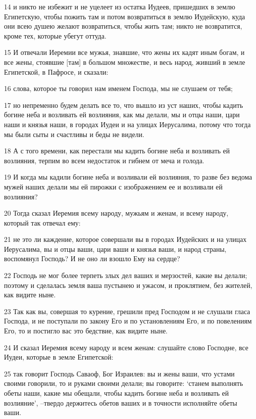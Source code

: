 \par 14 и никто не избежит и не уцелеет из остатка Иудеев, пришедших в землю Египетскую, чтобы пожить там и потом возвратиться в землю Иудейскую, куда они всею душею желают возвратиться, чтобы жить там; никто не возвратится, кроме тех, которые убегут оттуда.
\par 15 И отвечали Иеремии все мужья, знавшие, что жены их кадят иным богам, и все жены, стоявшие [там] в большом множестве, и весь народ, живший в земле Египетской, в Пафросе, и сказали:
\par 16 слова, которое ты говорил нам именем Господа, мы не слушаем от тебя;
\par 17 но непременно будем делать все то, что вышло из уст наших, чтобы кадить богине неба и возливать ей возлияния, как мы делали, мы и отцы наши, цари наши и князья наши, в городах Иудеи и на улицах Иерусалима, потому что тогда мы были сыты и счастливы и беды не видели.
\par 18 А с того времени, как перестали мы кадить богине неба и возливать ей возлияния, терпим во всем недостаток и гибнем от меча и голода.
\par 19 И когда мы кадили богине неба и возливали ей возлияния, то разве без ведома мужей наших делали мы ей пирожки с изображением ее и возливали ей возлияния?
\par 20 Тогда сказал Иеремия всему народу, мужьям и женам, и всему народу, который так отвечал ему:
\par 21 не это ли каждение, которое совершали вы в городах Иудейских и на улицах Иерусалима, вы и отцы ваши, цари ваши и князья ваши, и народ страны, воспомянул Господь? И не оно ли взошло Ему на сердце?
\par 22 Господь не мог более терпеть злых дел ваших и мерзостей, какие вы делали; поэтому и сделалась земля ваша пустынею и ужасом, и проклятием, без жителей, как видите ныне.
\par 23 Так как вы, совершая то курение, грешили пред Господом и не слушали гласа Господа, и не поступали по закону Его и по установлениям Его, и по повелениям Его, то и постигло вас это бедствие, как видите ныне.
\par 24 И сказал Иеремия всему народу и всем женам: слушайте слово Господне, все Иудеи, которые в земле Египетской:
\par 25 так говорит Господь Саваоф, Бог Израилев: вы и жены ваши, что устами своими говорили, то и руками своими делали; вы говорите: `станем выполнять обеты наши, какие мы обещали, чтобы кадить богине неба и возливать ей возлияние', --твердо держитесь обетов ваших и в точности исполняйте обеты ваши.
